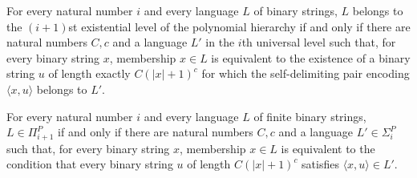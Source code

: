 \begin{theorem}
\label{Complexity.mem_SigmaP_succ_iff}
\leanok
{}
For every natural number $i$ and every language $L$ of binary strings, $L$ belongs to
the $(i+1)$st existential level of the polynomial hierarchy if and only if there are
natural numbers $C,c$ and a language $L'$ in the $i$th universal level such that, for
every binary string $x$, membership $x\in L$ is equivalent to the existence of a binary
string $u$ of length exactly $C(|x|+1)^c$ for which the self-delimiting pair encoding
$\langle x,u\rangle$ belongs to $L'$.
\end{theorem}

\begin{theorem}
\label{Complexity.mem_PiP_succ_iff}
\leanok
{}
For every natural number $i$ and every language $L$ of finite binary strings,
$L\in\Pi_{i+1}^P$ if and only if there are natural numbers $C,c$ and a language
$L'\in\Sigma_i^P$ such that, for every binary string $x$, membership $x\in L$ is
equivalent to the condition that every binary string $u$ of length $C(|x|+1)^c$
satisfies $\langle x,u\rangle\in L'$.
\end{theorem}

